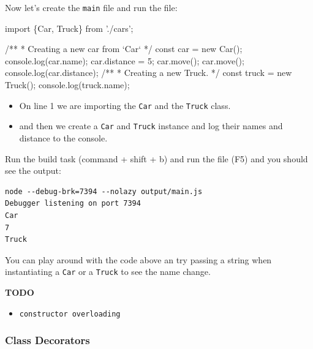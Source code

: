 \documentclass[12pt,]{article}
\newenvironment{Shaded}{}{}
\newcommand{\KeywordTok}[1]{\textcolor[rgb]{0.00,0.00,1.00}{{#1}}}
\newcommand{\DataTypeTok}[1]{{#1}}
\newcommand{\DecValTok}[1]{{#1}}
\newcommand{\CommentTok}[1]{\textcolor[rgb]{0.00,0.50,0.00}{{#1}}}
\newcommand{\FunctionTok}[1]{{#1}}
\newcommand{\NormalTok}[1]{{#1}}
\providecommand{\tightlist}{%
  \setlength{\itemsep}{0pt}\setlength{\parskip}{0pt}}
\begin{document}
Now let's create the \texttt{main} file and run the file:

\begin{Shaded}
\begin{Highlighting}[numbers=left,,]
\KeywordTok{import \{Car, Truck\} from './cars';}

\CommentTok{/**}
\CommentTok{ * Creating a new car from `Car`}
\CommentTok{ */}
\DataTypeTok{const} \NormalTok{car = }\KeywordTok{new} \FunctionTok{Car}\NormalTok{();}
\NormalTok{console.}\FunctionTok{log}\NormalTok{(car.}\FunctionTok{name}\NormalTok{);}
\NormalTok{car.}\FunctionTok{distance} \NormalTok{= }\DecValTok{5}\NormalTok{;}
\NormalTok{car.}\FunctionTok{move}\NormalTok{();}
\NormalTok{car.}\FunctionTok{move}\NormalTok{();}
\NormalTok{console.}\FunctionTok{log}\NormalTok{(car.}\FunctionTok{distance}\NormalTok{);}
\CommentTok{/**}
\CommentTok{ * Creating a new Truck.}
\CommentTok{ */}
\DataTypeTok{const} \NormalTok{truck = }\KeywordTok{new} \FunctionTok{Truck}\NormalTok{();}
\NormalTok{console.}\FunctionTok{log}\NormalTok{(truck.}\FunctionTok{name}\NormalTok{);}
\end{Highlighting}
\end{Shaded}

\begin{itemize}
\tightlist
\item
  On line 1 we are importing the \texttt{Car} and the \texttt{Truck}
  class.
\item
  and then we create a \texttt{Car} and \texttt{Truck} instance and log
  their names and distance to the console.
\end{itemize}

Run the build task (command + shift + b) and run the file (F5) and you
should see the output:

\begin{verbatim}
node --debug-brk=7394 --nolazy output/main.js
Debugger listening on port 7394
Car
7
Truck
\end{verbatim}

You can play around with the code above an try passing a string when
instantiating a \texttt{Car} or a \texttt{Truck} to see the name change.

\textbf{TODO}

\begin{itemize}
\tightlist
\item
  \texttt{constructor\ overloading}
\end{itemize}

\subsubsection{Class Decorators}\label{class-decorators}
\end{document}
